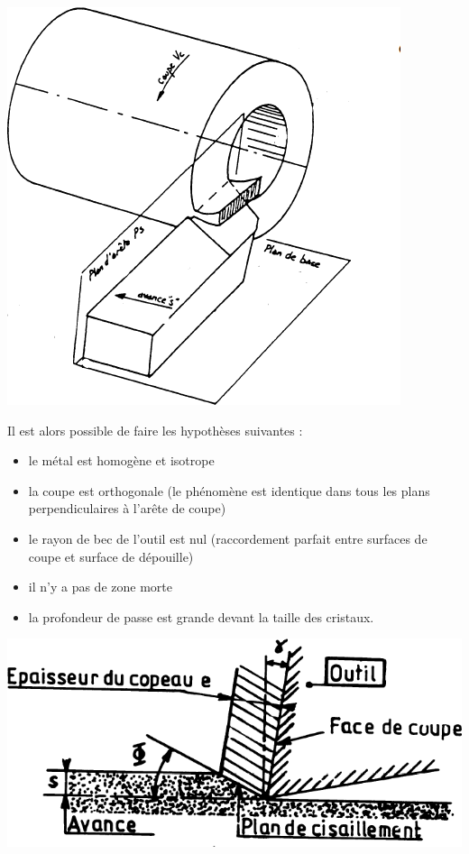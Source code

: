 \documentclass[11pt,oneside]{article}
\begin{document}
\noindent \begin{minipage}[c]{.45\linewidth}
\begin{center}
\includegraphics[width=.8\textwidth]{png/fig_21}
\end{center}
\end{minipage}\hfill
\begin{minipage}[c]{.45\linewidth}
Il est alors possible de faire les hypothèses suivantes :
\begin{itemize}
\item le métal est homogène et isotrope
\item la coupe est orthogonale (le phénomène est identique dans tous les plans perpendiculaires à l’arête de coupe)
\item le rayon de bec de l’outil est nul (raccordement parfait entre surfaces de coupe et surface de dépouille)
\item il n’y a pas de zone morte
\item la profondeur de passe est grande devant la taille des cristaux.
\end{itemize}
\end{minipage}

\begin{center}
\includegraphics[width=.5\textwidth]{png/fig_22}
\end{center}
\end{document}
